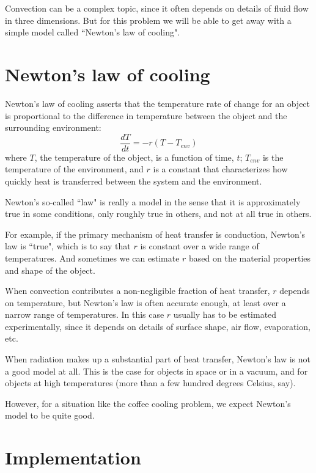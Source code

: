 \documentclass[12pt]{book}
\theoremstyle{exercise}
\begin{document}
Convection can be a complex topic, since it often depends on details of fluid flow in three dimensions.  But for this problem we will be able to get away with a simple model called ``Newton's law of cooling".


\section{Newton's law of cooling}

Newton's law of cooling asserts that the temperature rate of change for an object is proportional to the difference in temperature between the object and the surrounding environment:
%
\[ \frac{dT}{dt} = -r (T - T_{env}) \]
%
where $T$, the temperature of the object, is a function of time, $t$; $T_{env}$ is the temperature of the environment, and $r$ is a constant that characterizes how quickly heat is transferred between the system and the environment.

Newton's so-called ``law" is really a model in the sense that it is approximately true in some conditions, only roughly true in others, and not at all true in others.

For example, if the primary mechanism of heat transfer is conduction, Newton's law is ``true", which is to say that $r$ is constant over a wide range of temperatures.  And sometimes we can estimate $r$ based on the material properties and shape of the object.

When convection contributes a non-negligible fraction of heat transfer, $r$  depends on temperature, but Newton's law is often accurate enough, at least over a narrow range of temperatures.  In this case $r$ usually has to be estimated experimentally, since it depends on details of surface shape, air flow, evaporation, etc.

When radiation makes up a substantial part of heat transfer, Newton's law is not a good model at all.  This is the case for objects in space or in a vacuum, and for objects at high temperatures (more than a few hundred degrees Celsius, say).


However, for a situation like the coffee cooling problem, we expect Newton's model to be quite good.


\section{Implementation}
\label{coffee_impl}
\end{document}

